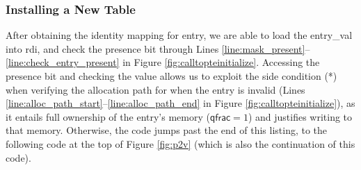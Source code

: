  \subsubsection{Installing a New Table}
 After obtaining the identity mapping for \textsf{entry}, we are able to load the \textsf{entry\_val} into \textsf{rdi}, and check the presence bit through
Lines \ref{line:mask_present}--\ref{line:check_entry_present} in Figure \ref{fig:calltopteinitialize}.
Accessing the presence bit and checking the value allows us to exploit the side condition (*) when verifying the allocation
path for when the entry is invalid (Lines \ref{line:alloc_path_start}--\ref{line:alloc_path_end} in Figure \ref{fig:calltopteinitialize}),
as it entails full ownership of the entry's memory ($\textsf{qfrac} = 1$) and justifies writing to that memory.
Otherwise, the code jumps past the end of this listing, to the following code at the top of Figure \ref{fig:p2v} (which is also the
continuation of this code).

